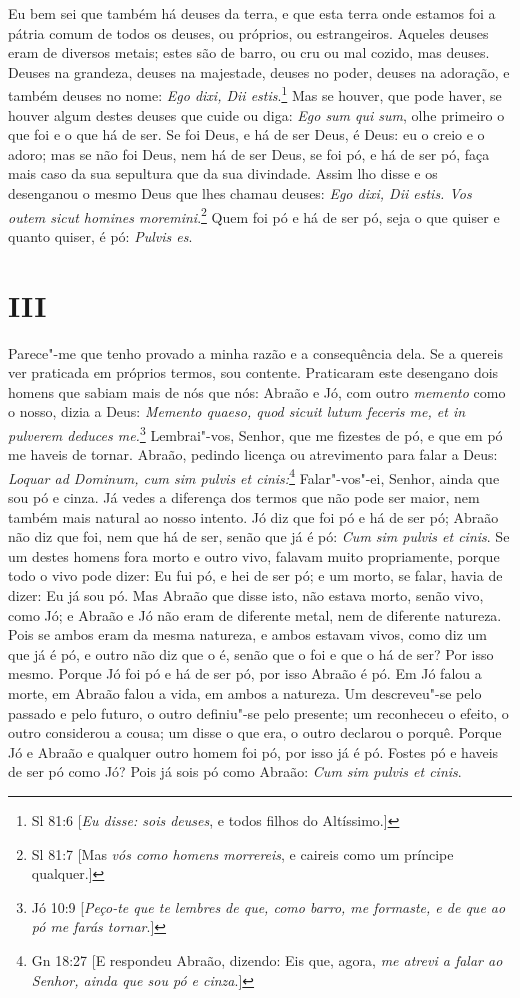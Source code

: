 Eu bem sei que também há deuses da terra, e que esta terra onde
estamos foi a pátria comum de todos os deuses, ou próprios, ou
estrangeiros. Aqueles deuses eram de diversos metais; estes são de
barro, ou cru ou mal cozido, mas deuses. Deuses na grandeza, deuses na
majestade, deuses no poder, deuses na adoração, e
também deuses no nome: \emph{Ego dixi, Dii estis}.\footnote{Sl 81:6 [\emph{Eu disse: sois deuses}, e todos filhos do Altíssimo.]} Mas se houver, que
pode haver, se houver algum destes deuses que cuide ou diga: \emph{Ego
sum qui sum}, olhe primeiro o que foi e o que há de ser. Se foi Deus, e
há de ser Deus, é Deus: eu o creio e o adoro; mas se não foi Deus, nem
há de ser Deus, se foi pó, e há de ser pó, faça mais caso da sua
sepultura que da sua divindade. Assim lho disse e os desenganou o mesmo
Deus que lhes chamau deuses: \emph{Ego dixi, Dii estis. Vos outem sicut
homines moremini}.\footnote{Sl 81:7 [Mas \emph{vós como homens morrereis}, e caireis como um príncipe qualquer.]} Quem foi pó e há de ser pó, seja o que quiser e
quanto quiser, é pó: \emph{Pulvis es}.

\section*{III}

Parece"-me que tenho provado a minha razão e a consequência dela. Se a
quereis ver praticada em próprios termos, sou contente. Praticaram este
desengano dois homens que sabiam mais de nós que nós: Abraão e Jó, com
outro \emph{memento} como o nosso, dizia a Deus: \emph{Memento quaeso,
quod sicuit lutum feceris me, et in pulverem deduces me.}\footnote{Jó 10:9 [\emph{Peço-te que te lembres de que, como barro, me formaste, e de que ao pó me farás tornar}.]} Lembrai"-vos, Senhor, que me fizestes de pó, e que em pó me haveis de tornar. 
Abraão, pedindo licença ou atrevimento para falar a Deus:
\emph{Loquar ad Dominum, cum sim pulvis et cinis:}\footnote{Gn 18:27 [E respondeu Abraão, dizendo: Eis que, agora, \emph{me atrevi a falar ao Senhor, ainda que sou
pó e cinza}.]} Falar"-vos"-ei, Senhor,
ainda que sou pó e cinza. Já vedes a diferença dos
termos que não pode ser maior, nem também mais natural ao nosso intento.
Jó diz que foi pó e há de ser pó; Abraão não diz que foi, nem que há de
ser, senão que já é pó: \emph{Cum sim pulvis et cinis}. Se um destes
homens fora morto e outro vivo, falavam muito propriamente, porque todo
o vivo pode dizer: Eu fui pó, e hei de ser pó; e um morto, se falar,
havia de dizer: Eu já sou pó. Mas Abraão que disse isto, não estava
morto, senão vivo, como Jó; e Abraão e Jó não eram de diferente metal,
nem de diferente natureza. Pois se ambos eram da mesma natureza, e ambos
estavam vivos, como diz um que já é pó, e outro não diz que o é, senão
que o foi e que o há de ser? Por isso mesmo. Porque Jó foi pó e há de
ser pó, por isso Abraão é pó. Em Jó falou a morte, em
Abraão falou a vida, em ambos a natureza. Um descreveu"-se pelo passado e
pelo futuro, o outro definiu"-se pelo presente; um reconheceu o efeito, o
outro considerou a cousa; um disse o que era, o outro declarou o porquê.
Porque Jó e Abraão e qualquer outro homem foi pó, por isso já é pó.
Fostes pó e haveis de ser pó como Jó? Pois já sois pó como Abraão:
\emph{Cum sim pulvis et cinis}.

